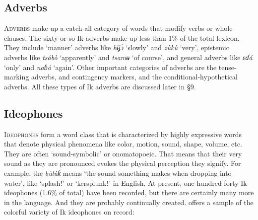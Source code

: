 \subsection{Adverbs}\label{sec:3.9}


\textsc{Adverbs} make up a catch-all category of words that modify verbs or whole clauses. The sixty-or-so Ik adverbs make up less than 1\% of the total lexicon. They include ‘manner’ adverbs like \textit{hɨ{\Í}ʝ\'{ɔ}} ‘slowly’ and \textit{zùkù} ‘very’, epistemic adverbs like \textit{tsábò} ‘apparently’ and \textit{tsamʉ} ‘of course’, and general adverbs like \textit{ɛɗá} ‘only’ and \textit{naɓó} ‘again’. Other important categories of adverbs are the tense-marking adverbs,  and contingency markers, and the conditional-hypothetical adverbs. All these types of Ik adverbs are discussed later in §9.




\subsection{Ideophones}\label{sec:3.10}


\textsc{Ideophones} form a word class that is characterized by highly expressive words that denote physical phenomena like color, motion, sound, shape, volume, etc. They are often ‘sound-symbolic’ or onomatopoeic. That means that their very sound as they are pronounced evokes the physical perception they signify. For example, the  \textit{bùlùƙ\ᵘ} means ‘the sound something makes when dropping into water’, like ‘splashǃ’ or ‘kersplunkǃ’ in English. At present, one hundred forty Ik ideophones (1.6\% of total) have been recorded, but there are certainly many more in the language. And they are probably continually created.  offers a sample of the colorful variety of Ik ideophones on record:


